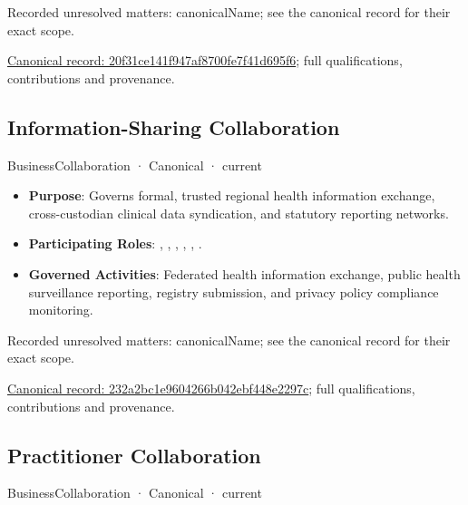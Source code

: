 {\small Recorded unresolved matters: canonicalName; see the canonical record for their exact scope.}\par
{\footnotesize \href{../../../../continuum/business/business-collaboration/20f31ce141f947af8700fe7f41d695f6.md}{Canonical record: 20f31ce141f947af8700fe7f41d695f6}; full qualifications, contributions and provenance.}\par
\subsection{Information-Sharing Collaboration}

\label{element:232a2bc1e9604266b042ebf448e2297c}
{\small BusinessCollaboration · Canonical · current}\par

\begin{itemize}


\item \textbf{Purpose}: Governs formal, trusted regional health information exchange, cross-custodian clinical data syndication, and statutory reporting networks.

\item \textbf{Participating Roles}: \texttt{}, \texttt{}, \texttt{}, \texttt{}, \texttt{}, \texttt{}.

\item \textbf{Governed Activities}: Federated health information exchange, public health surveillance reporting, registry submission, and privacy policy compliance monitoring.

\end{itemize}

{\small Recorded unresolved matters: canonicalName; see the canonical record for their exact scope.}\par
{\footnotesize \href{../../../../continuum/business/business-collaboration/232a2bc1e9604266b042ebf448e2297c.md}{Canonical record: 232a2bc1e9604266b042ebf448e2297c}; full qualifications, contributions and provenance.}\par
\subsection{Practitioner Collaboration}

\label{element:aeca28004a834fb1acbbf6946ab84a33}
{\small BusinessCollaboration · Canonical · current}\par

